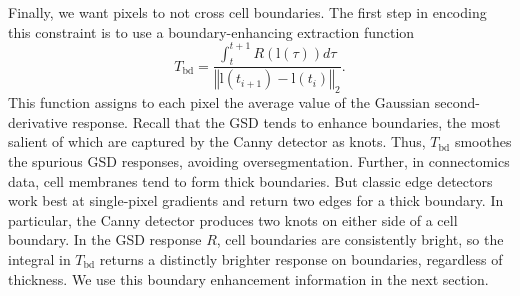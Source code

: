 \documentclass[english]{article}
\newcommand{\+}[1]{\ensuremath{\boldsymbol{\mathrm{#1}}}}
\begin{document}
Finally, we want pixels to not cross cell boundaries. The first step in encoding this constraint is to use a boundary-enhancing extraction function \cite{Kumar2010} $$T_{\text{bd}} = \frac{\int_t^{t+1} R\left( \+{l}(\tau) \right) d\tau }{\left\Vert \+{l}(t_{i+1}) - \+{l}(t_{i}) \right\Vert_2 }.$$ This function assigns to each pixel the average value of the Gaussian second-derivative response. Recall that the GSD tends to enhance boundaries, the most salient of which are captured by the Canny detector as knots. Thus, $T_{\text{bd}}$ smoothes the spurious GSD responses, avoiding oversegmentation. Further, in connectomics data, cell membranes tend to form thick boundaries. But classic edge detectors work best at single-pixel gradients and return two edges for a thick boundary. In particular, the Canny detector produces two knots on either side of a cell boundary. In the GSD response $R$, cell boundaries are consistently bright, so the integral in $T_{\text{bd}}$ returns a distinctly brighter response on boundaries, regardless of thickness. We use this boundary enhancement information in the next section.
\end{document}
